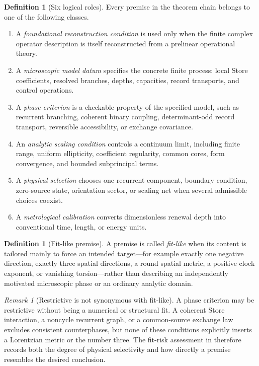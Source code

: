 \documentclass[11pt]{article}
\theoremstyle{definition}
\newtheorem{definition}[theorem]{Definition}
\theoremstyle{remark}
\newtheorem{remark}[theorem]{Remark}
\begin{document}
\begin{definition}[Six logical roles]
Every premise in the theorem chain belongs to one of the following classes.
\begin{enumerate}[label=\textup{(\arabic*)},leftmargin=2.8em]
\item A \emph{foundational reconstruction condition} is used only when the
      finite complex operator description is itself reconstructed from a
      prelinear operational theory.
\item A \emph{microscopic model datum} specifies the concrete finite process:
      local Store coefficients, resolved branches, depths, capacities, record
      transports, and control operations.
\item A \emph{phase criterion} is a checkable property of the specified model,
      such as recurrent branching, coherent binary coupling, determinant-odd
      record transport, reversible accessibility, or exchange covariance.
\item An \emph{analytic scaling condition} controls a continuum limit, including
      finite range, uniform ellipticity, coefficient regularity, common cores,
      form convergence, and bounded subprincipal terms.
\item A \emph{physical selection} chooses one recurrent component, boundary
      condition, zero-source state, orientation sector, or scaling net when
      several admissible choices coexist.
\item A \emph{metrological calibration} converts dimensionless renewal depth
      into conventional time, length, or energy units.
\end{enumerate}
\end{definition}

\begin{definition}[Fit-like premise]
A premise is called \emph{fit-like} when its content is tailored mainly to force
an intended target---for example exactly one negative direction, exactly three
spatial directions, a round spatial metric, a positive clock exponent, or
vanishing torsion---rather than describing an independently motivated
microscopic phase or an ordinary analytic domain.
\end{definition}

\begin{remark}[Restrictive is not synonymous with fit-like]
A phase criterion may be restrictive without being a numerical or structural
fit.  A coherent Store interaction, a noncycle recurrent graph, or a
common-source exchange law excludes consistent counterphases, but none of these
conditions explicitly inserts a Lorentzian metric or the number three.  The
fit-risk assessment in  therefore records both the degree of
physical selectivity and how directly a premise resembles the desired
conclusion.
\end{remark}
\end{document}
